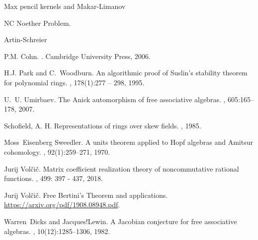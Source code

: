 Max pencil kernels and Makar-Limanov

NC Noether Problem.

Artin-Schreier










\begin{thebibliography}{6}

P.M. Cohn.
.
\newblock Cambridge University Press, 2006.


H.J. Park and C.~Woodburn.
\newblock An algorithmic proof of {S}uslin's stability theorem for polynomial
  rings.
, 178(1):277 -- 298, 1995.

U.~U. Umirbaev.
\newblock The {A}nick automorphism of free associative algebras.
, 605:165--178, 2007.


Schofield, A. H.
\newblock Representations of rings over skew fields.
, 1985.


Moss~Eisenberg Sweedler.
\newblock A units theorem applied to {H}opf algebras and {A}mitsur cohomology.
, 92(1):259--271, 1970.



Jurij Vol{\v c}i{\v c}.
\newblock Matrix coefficient realization theory of noncommutative rational functions.
, 499: 397 - 437, 2018.

Jurij Vol{\v c}i{\v c}.
\newblock Free Bertini's Theorem and applications.
\newblock \url{https://arxiv.org/pdf/1908.08948.pdf}.



Warren~Dicks and Jacques!Lewin.
\newblock A {J}acobian conjecture for free associative algebras.
, 10(12):1285--1306, 1982.

\end{thebibliography}


